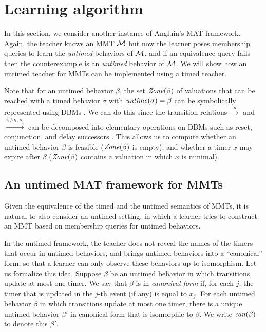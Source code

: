 \section{Learning algorithm}  
\label{algorithm}
In this section, we consider another instance of Angluin's MAT framework.
Again, the teacher knows an MMT ${\mathcal M}$ but now the learner poses membership queries
to learn the \emph{untimed} behaviors of ${\mathcal M}$, and if an equivalence query fails then the counterexample is an \emph{untimed} behavior of ${\mathcal M}$.
%
We will show how an untimed teacher for MMTs can be implemented using a timed teacher.

\ifshort
Note that for an untimed behavior $\beta$, the set $\mathit{Zone}({\beta})$ of valuations that can be reached with a timed behavior $\sigma$ with $\mathit{untime}(\sigma) = \beta$ can be symbolically represented using DBMs \cite{Di89}.
We can do this since the transition relations $\xrightarrow{d}$ and $\xrightarrow{i_1/o_1, \rho_1}$ can be decomposed 
into elementary operations on DBMs such as reset, conjunction, and delay successors \cite{BengtssonY03}.
This allows us to compute whether an untimed behavior $\beta$ is feasible ($\mathit{Zone}({\beta})$ is empty), and
whether a timer $x$ may expire after $\beta$ ($\mathit{Zone}({\beta})$ contains a valuation in which $x$ is minimal).
\fi

\subsection{An untimed MAT framework for MMTs}
Given the equivalence of the timed and the untimed semantics of MMTs, it is natural to also 
consider an untimed setting, in which a learner tries to construct an MMT based on membership queries for untimed behaviors.

In the untimed framework, the teacher does not reveal the names of the timers that occur in untimed behaviors, 
and brings untimed behaviors into a ``canonical'' form, so that a learner can only observe these behaviors up to isomorphism.
Let us formalize this idea.
Suppose $\beta$ be an untimed behavior in which transitions update at most one timer.
We say that $\beta$ is in \emph{canonical form} if, for each $j$, the timer that is updated in the $j$-th event
(if any) is equal to $x_j$.
For each untimed behavior $\beta$ in which transitions update at most one timer, there is a unique untimed behavior
$\beta'$ in canonical form that is isomorphic to $\beta$.
We write $\mathit{can}({\beta})$ to denote this $\beta'$.

